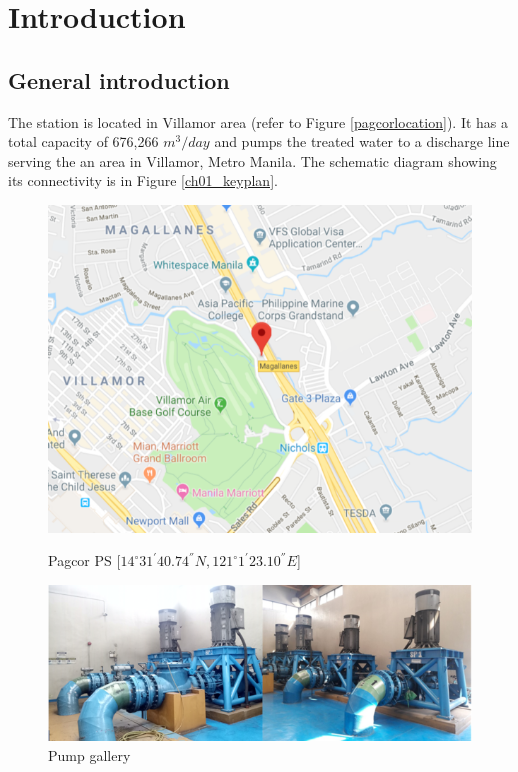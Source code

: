 
\chapter{Introduction} %
\label{Chapter1}

\section{General introduction} \label{namdario}
The station is located in Villamor area (refer to Figure \ref{pagcorlocation}). It has a total capacity of 676,266 $m^3/day$ and pumps the treated water to a discharge line serving the an area in Villamor, Metro Manila. The schematic diagram showing its connectivity is in Figure \ref{ch01_keyplan}.


\begin{figure}[!htb]
	\begin{minipage}[b]{0.5\linewidth}
		\centering
		\includegraphics[width=\textwidth]{figures/pslocation}
		\caption{Pagcor PS [$14^{\circ}31^{'}40.74^{''}N, 121^{\circ}1^{'}23.10^{''}E$]}
		\label{pagcorlocation}
	\end{minipage}
	\hspace{0.05cm}
	\begin{minipage}[b]{0.5\linewidth}
		\centering
		\includegraphics[width=\textwidth]{figures/ch01_pumpgallery}
		\caption{Pump gallery}
		\label{ch01_pumpgallery}
	\end{minipage}
\end{figure}

